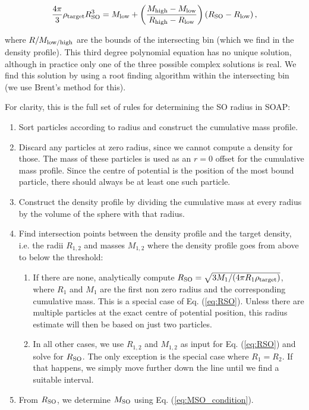 \documentclass{article}
\begin{document}
\begin{equation}
    \frac{4\pi{}}{3} \rho{}_{\rm{}target} R_{\rm{}SO}^3 = M_{\rm{}low} + \left( \frac{M_{\rm{}high}-M_{\rm{}low}}{R_{\rm{}high} - R_{\rm{}low}} \right) \left(R_{\rm{}SO} - R_{\rm{}low}\right),
    \label{eq:RSO}
\end{equation}

where $R/M_{\rm{}low/high}$ are the bounds of the intersecting bin (which we find in the density profile). 
This third degree polynomial equation has no unique solution, although in practice only one of the three 
possible complex solutions is real. We find this solution by using a root finding algorithm within the 
intersecting bin (we use Brent's method for this).

For clarity, this is the full set of rules for determining the SO radius in SOAP:
\begin{enumerate}
    \item Sort particles according to radius and construct the cumulative mass profile.
    \item Discard any particles at zero radius, since we cannot compute a density for those. The mass of these 
    particles is used as an $r=0$ offset for the cumulative mass profile. Since the centre of potential is the 
    position of the most bound particle, there should always be at least one such particle.
    \item Construct the density profile by dividing the cumulative mass at every radius by the volume of the 
    sphere with that radius.
    \item Find intersection points between the density profile and the target density, i.e. the radii 
    $R_{1,2}$ and masses $M_{1,2}$ where the density profile goes from above to below the threshold:
    \begin{enumerate}
        \item If there are none, analytically compute $R_{\rm{}SO}=\sqrt{3M_1/(4\pi{}R_1\rho_{\rm{}target})}$, 
        where $R_1$ and $M_1$ are the first non zero radius and the corresponding cumulative mass. This is a 
        special case of Eq. (\ref{eq:RSO}). Unless there are multiple particles at the exact centre of potential 
        position, this radius estimate will then be based on just two particles.
        \item In all other cases, we use $R_{1,2}$ and $M_{1,2}$ as input for Eq. (\ref{eq:RSO}) and solve for 
        $R_{\rm{}SO}$. The only exception is the special case where $R_1 = R_2$. If that happens, we simply 
        move further down the line until we find a suitable interval.

    \end{enumerate}
    \item From $R_{\rm{}SO}$, we determine $M_{\rm{}SO}$ using Eq. (\ref{eq:MSO_condition}).
\end{enumerate}
\end{document}
